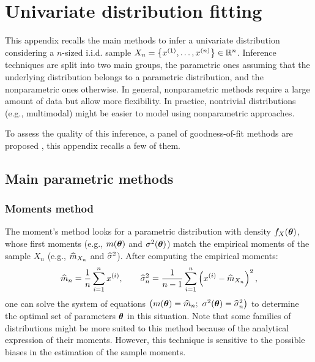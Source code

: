 \cleardoublepage
\chapter{Univariate distribution fitting}
\label{apx:A}

This appendix recalls the main methods to infer a univariate distribution considering a $n$-sized i.i.d. sample $X_n = \left\{x^{(1)}, \dots, x^{(n)}\right\} \in \mathbb{R}^{n}$. 
Inference techniques are split into two main groups, the parametric ones assuming that the underlying distribution belongs to a parametric distribution, and the nonparametric ones otherwise. 
In general, nonparametric methods require a large amount of data but allow more flexibility. 
In practice, nontrivial distributions (e.g., multimodal) might be easier to model using nonparametric approaches.

To assess the quality of this inference, a panel of goodness-of-fit methods are proposed \citep{saporta_2006}, this appendix recalls a few of them. 

\section*{Main parametric methods}

\subsection*{Moments method}
The moment's method looks for a parametric distribution with density $f_X({\boldsymbol{\theta}})$, whose first moments (e.g., $m({\boldsymbol{\theta}})$ and $\sigma^2({\boldsymbol{\theta}})$) match 
the empirical moments of the sample $X_n$ (e.g., $\widehat{m}_{X_n}$ and $\widehat{\sigma}^2$). After computing the empirical moments: 
\begin{equation}
    \widehat{m}_{n} = \frac1n \sum_{i=1}^{n} x^{(i)}, \qquad \widehat{\sigma}^2_n = \frac{1}{n-1} \sum_{i=1}^{n} \left(x^{(i)} - \widehat{m}_{X_n}\right)^2,
\end{equation} 
one can solve the system of equations $\left(m(\btheta) = \what{m}_{n}; \ \sigma^2(\btheta) = \what{\sigma}_n^2\right)$ to determine the optimal set of parameters ${\boldsymbol{\theta}}$ in this situation. 
Note that some families of distributions might be more suited to this method because of the analytical expression of their moments. 
However, this technique is sensitive to the possible biases in the estimation of the sample moments.

